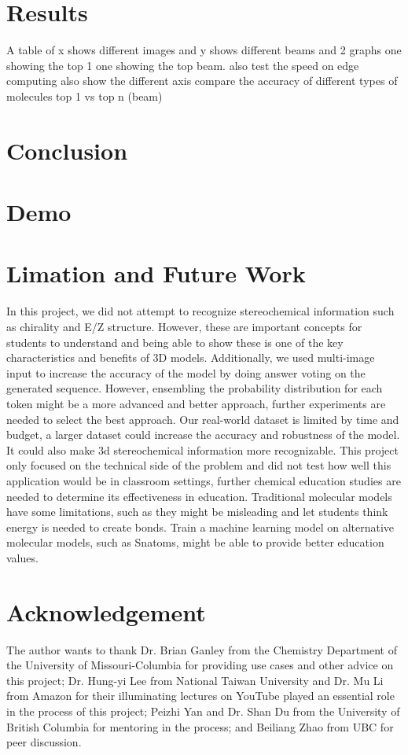 \documentclass[conference]{IEEEtran}
\begin{document}
\section{Results}
A table of x shows different images and y shows different beams and 2 graphs one showing the top 1 one showing the top beam.  
also test the speed on edge computing also show the different axis
compare the accuracy of different types of molecules
top 1 vs top n (beam)
\section{Conclusion}
\section{Demo}
\section{Limation and Future Work}
In this project, we did not attempt to recognize stereochemical information such as chirality and E/Z structure. However, these are important concepts for students to understand and being able to show these is one of the key characteristics and benefits of 3D models. 
Additionally, we used multi-image input to increase the accuracy of the model by doing answer voting on the generated sequence. However, ensembling the probability distribution for each token might be a more advanced and better approach, further experiments are needed to select the best approach.
Our real-world dataset is limited by time and budget, a larger dataset could increase the accuracy and robustness of the model. It could also make 3d stereochemical information more recognizable.
This project only focused on the technical side of the problem and did not test how well this application would be in classroom settings, further chemical education studies are needed to determine its effectiveness in education. 
Traditional molecular models have some limitations, such as they might be misleading and let students think energy is needed to create bonds\cite{snatoms}. Train a machine learning model on alternative molecular models, such as Snatoms\cite{snatoms}, might be able to provide better education values.
\section*{Acknowledgement}
The author wants to thank Dr. Brian Ganley from the Chemistry Department of the University of Missouri-Columbia for providing use cases and other advice on this project; Dr. Hung-yi Lee from National Taiwan University and Dr. Mu Li from Amazon for their illuminating lectures on YouTube played an essential role in the process of this project; Peizhi Yan and Dr. Shan Du from the University of British Columbia for mentoring in the process; and Beiliang Zhao from UBC for peer discussion.
\end{document}
